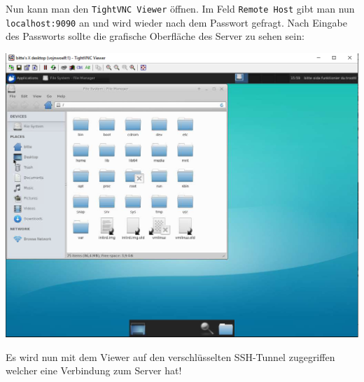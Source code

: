 Nun kann man den \verb|TightVNC Viewer| öffnen. Im Feld \verb|Remote Host| gibt man nun \verb|localhost:9090| an und wird wieder nach dem Passwort gefragt. Nach Eingabe des Passworts sollte die grafische Oberfläche des Server zu sehen sein:

\begin{minipage}{\linewidth}
	\centering
	\includegraphics[width=0.8\linewidth]{images/gui}
\end{minipage}

Es wird nun mit dem Viewer auf den verschlüsselten SSH-Tunnel zugegriffen welcher eine Verbindung zum Server hat!
